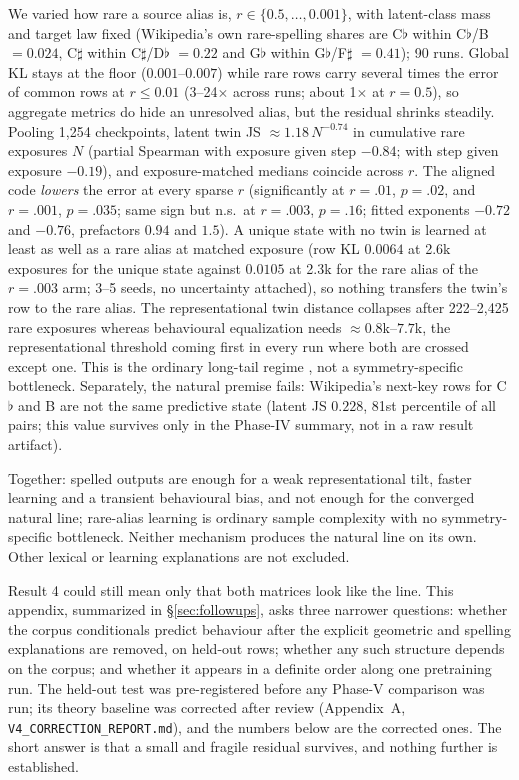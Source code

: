 \documentclass[11pt]{article}
\newcommand{\fl}{$\flat$}
\newcommand{\sh}{$\sharp$}
\begin{document}
\begin{resultbox}
We varied how rare a source alias is, $r\in\{0.5,\ldots,0.001\}$, with latent-class mass and target law fixed (Wikipedia's own rare-spelling shares are C\fl{} within C\fl/B $=0.024$, C\sh{} within C\sh/D\fl{} $=0.22$ and G\fl{} within G\fl/F\sh{} $=0.41$); 90 runs. Global KL stays at the floor ($0.001$--$0.007$) while rare rows carry several times the error of common rows at $r\le0.01$ (3--24$\times$ across runs; about 1$\times$ at $r=0.5$), so aggregate metrics do hide an unresolved alias, but the residual shrinks steadily. Pooling 1,254 checkpoints, latent twin JS $\approx1.18\,N^{-0.74}$ in cumulative rare exposures $N$ (partial Spearman with exposure given step $-0.84$; with step given exposure $-0.19$), and exposure-matched medians coincide across $r$. The aligned code \emph{lowers} the error at every sparse $r$ (significantly at $r=.01$, $p=.02$, and $r=.001$, $p=.035$; same sign but n.s.\ at $r=.003$, $p=.16$; fitted exponents $-0.72$ and $-0.76$, prefactors $0.94$ and $1.5$). A unique state with no twin is learned at least as well as a rare alias at matched exposure (row KL $0.0064$ at 2.6k exposures for the unique state against $0.0105$ at 2.3k for the rare alias of the $r=.003$ arm; 3--5 seeds, no uncertainty attached), so nothing transfers the twin's row to the rare alias. The representational twin distance collapses after 222--2,425 rare exposures whereas behavioural equalization needs $\approx0.8$k--$7.7$k, the representational threshold coming first in every run where both are crossed except one. This is the ordinary long-tail regime \citep{kandpal2023longtail}, not a symmetry-specific bottleneck. Separately, the natural premise fails: Wikipedia's next-key rows for C\fl{} and B are not the same predictive state (latent JS $0.228$, 81st percentile of all pairs; this value survives only in the Phase-IV summary, not in a raw result artifact).
\end{resultbox}

Together: spelled outputs are enough for a weak representational tilt, faster learning and a transient behavioural bias, and not enough for the converged natural line; rare-alias learning is ordinary sample complexity with no symmetry-specific bottleneck. Neither mechanism produces the natural line on its own. Other lexical or learning explanations are not excluded.




Result 4 could still mean only that both matrices look like the line. This appendix, summarized in \S\ref{sec:followups}, asks three narrower questions: whether the corpus conditionals predict behaviour after the explicit geometric and spelling explanations are removed, on held-out rows; whether any such structure depends on the corpus; and whether it appears in a definite order along one pretraining run. The held-out test was pre-registered before any Phase-V comparison was run; its theory baseline was corrected after review (Appendix~A, \texttt{V4\_CORRECTION\_REPORT.md}), and the numbers below are the corrected ones. The short answer is that a small and fragile residual survives, and nothing further is established.
\end{document}
